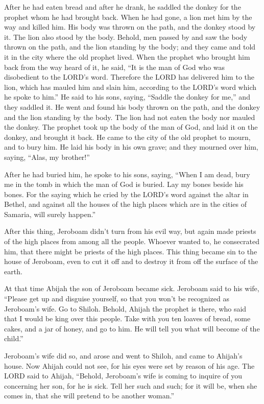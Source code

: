 \myverse{}After he had eaten bread and after he drank, he saddled the
donkey for the prophet whom he had brought back.
\myverse{}When he had gone, a lion met him by the way and killed him. His body was
thrown on the path, and the donkey stood by it. The lion also stood by the body.
\myverse{}Behold, men passed by and saw the body thrown on the path, and the lion standing
by the body; and they came and told it in the city where the old prophet lived.
\myverse{}When the prophet who brought him back from the way heard of it, he said,
“It is the man of God who was disobedient to the LORD’s word. Therefore the LORD has delivered him to
the lion, which has mauled him and slain him, according to the LORD’s word which he spoke to him.”
\myverse{}He said to his sons, saying, “Saddle the donkey for me,” and they saddled
it.
\myverse{}He went and found his body thrown on the path, and the donkey and the lion
standing by the body. The lion had not eaten the body nor mauled the donkey.
\myverse{}The prophet took up the body of the man of God, and laid it on the donkey,
and brought it back. He came to the city of the old prophet to mourn, and to bury him.
\myverse{}He laid his body in his own grave; and they mourned over him, saying, “Alas,
my brother!”

\myverse{}After he had buried him, he spoke to his sons, saying, “When
I am dead, bury me in the tomb in which the man of God is buried. Lay my bones beside his bones.
\myverse{}For the saying which he cried by the LORD’s word against the altar in Bethel,
and against all the houses of the high places which are in the cities of Samaria, will surely happen.”

\myverse{}After this thing, Jeroboam didn’t turn from his evil way, but
again made priests of the high places from among all the people. Whoever wanted to, he consecrated him,
that there might be priests of the high places.
\myverse{}This thing became sin to the house of Jeroboam, even to cut it off and to
destroy it from off the surface of the earth.


\mychapter{} \myverse*{}At that time Abijah the son of Jeroboam became sick.
\myverse{}Jeroboam said to his wife, “Please get up and disguise yourself, so that you
won’t be recognized as Jeroboam’s wife. Go to Shiloh. Behold, Ahijah the prophet is there, who said that
I would be king over this people.
\myverse{}Take with you ten loaves of bread, some cakes, and a jar of honey, and go to
him. He will tell you what will become of the child.”

\myverse{}Jeroboam’s wife did so, and arose and went to Shiloh, and came
to Ahijah’s house. Now Ahijah could not see, for his eyes were set by reason of his age.
\myverse{}The LORD said to Ahijah, “Behold, Jeroboam’s wife is coming to inquire of you
concerning her son, for he is sick. Tell her such and such; for it will be, when she comes in, that she
will pretend to be another woman.”

